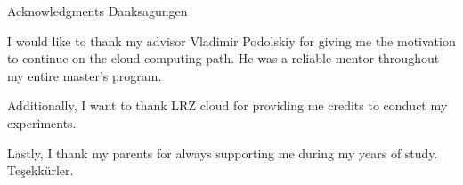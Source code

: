 \makeatletter
{}
{}
{}
\makeatother
\thispagestyle{empty}

\vspace*{20mm}

\begin{center}
\makeatletter
{}
{ Acknowledgments}
{ Danksagungen}
\makeatother
\end{center}

\vspace{10mm}

I would like to thank my advisor Vladimir Podolskiy for giving me the motivation to continue on the cloud computing path. He was a reliable mentor throughout my entire master's program.

Additionally, I want to thank LRZ cloud for providing me credits to conduct my experiments. 

Lastly, I thank my parents for always supporting me during my years of study. Teşekkürler.

\cleardoublepage{}
